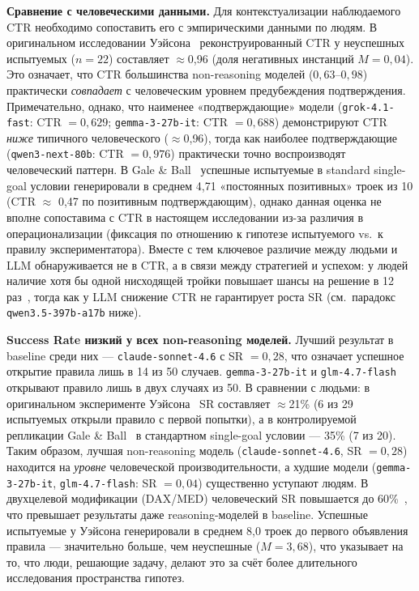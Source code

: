 \textbf{Сравнение с человеческими данными.} Для контекстуализации наблюдаемого CTR необходимо сопоставить его с эмпирическими данными по людям. В оригинальном исследовании Уэйсона~\cite{wason1960failure} реконструированный CTR у неуспешных испытуемых ($n = 22$) составляет $\approx$0{,}96 (доля негативных инстанций $M = 0{,}04$). Это означает, что CTR большинства non-reasoning моделей ($0{,}63$--$0{,}98$) практически \textit{совпадает} с человеческим уровнем предубеждения подтверждения. Примечательно, однако, что наименее «подтверждающие» модели (\texttt{grok-4.1-fast}: CTR $= 0{,}629$; \texttt{gemma-3-27b-it}: CTR $= 0{,}688$) демонстрируют CTR \textit{ниже} типичного человеческого ($\approx$0{,}96), тогда как наиболее подтверждающие (\texttt{qwen3-next-80b}: CTR $= 0{,}976$) практически точно воспроизводят человеческий паттерн. В Gale \& Ball~\cite{gale2006dualgoal} успешные испытуемые в standard single-goal условии генерировали в среднем 4{,}71 «постоянных позитивных» троек из 10 (CTR $\approx$ 0{,}47 по позитивным подтверждающим), однако данная оценка не вполне сопоставима с CTR в настоящем исследовании из-за различия в операционализации (фиксация по отношению к гипотезе испытуемого vs.\ к правилу экспериментатора). Вместе с тем ключевое различие между людьми и LLM обнаруживается не в CTR, а в связи между стратегией и успехом: у людей наличие хотя бы одной нисходящей тройки повышает шансы на решение в 12 раз~\cite{gale2006dualgoal}, тогда как у LLM снижение CTR не гарантирует роста SR (см.\ парадокс \texttt{qwen3.5-397b-a17b} ниже).

\textbf{Success Rate низкий у всех non-reasoning моделей.} Лучший результат в baseline среди них --- \texttt{claude-sonnet-4.6} с SR $= 0{,}28$, что означает успешное открытие правила лишь в 14 из 50 случаев. \texttt{gemma-3-27b-it} и \texttt{glm-4.7-flash} открывают правило лишь в двух случаях из 50. В сравнении с людьми: в оригинальном эксперименте Уэйсона~\cite{wason1960failure} SR составляет $\approx$21\% (6 из 29 испытуемых открыли правило с первой попытки), а в контролируемой репликации Gale \& Ball~\cite{gale2006dualgoal} в стандартном single-goal условии --- 35\% (7 из 20). Таким образом, лучшая non-reasoning модель (\texttt{claude-sonnet-4.6}, SR $= 0{,}28$) находится на \textit{уровне} человеческой производительности, а худшие модели (\texttt{gemma-3-27b-it}, \texttt{glm-4.7-flash}: SR $= 0{,}04$) существенно уступают людям. В двухцелевой модификации (DAX/MED) человеческий SR повышается до 60\%~\cite{tweney1980strategies}, что превышает результаты даже reasoning-моделей в baseline. Успешные испытуемые у Уэйсона генерировали в среднем 8{,}0 троек до первого объявления правила --- значительно больше, чем неуспешные ($M = 3{,}68$), что указывает на то, что люди, решающие задачу, делают это за счёт более длительного исследования пространства гипотез.

